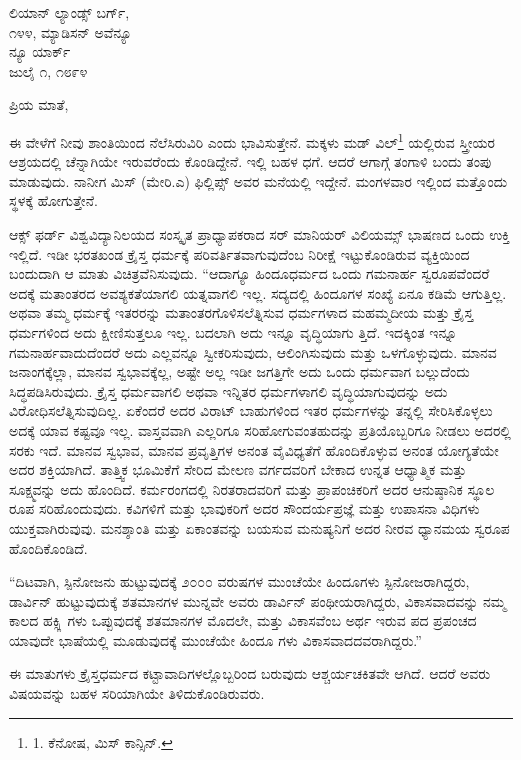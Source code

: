 \begin{flushright}
 ಲಿಯಾನ್ ಲ್ಯಾಂಡ್ಸ್ ಬರ್ಗ್,\\೧೪೪, ಮ್ಯಾಡಿಸನ್ ಅವೆನ್ಯೂ\\ನ್ಯೂ ಯಾರ್ಕ್\\ಜುಲೈ ೧, ೧೮೯೪
\end{flushright}

ಪ್ರಿಯ ಮಾತೆ,

ಈ ವೇಳೆಗೆ ನೀವು ಶಾಂತಿಯಿಂದ ನೆಲೆಸಿರುವಿರಿ ಎಂದು ಭಾವಿಸುತ್ತೇನೆ. ಮಕ್ಕಳು ಮಡ್ ವಿಲ್\footnote{1. ಕೆನೋಷ, ಮಿಸ್ ಕಾನ್ಸಿನ್.} ಯಲ್ಲಿರುವ ಸ್ತ್ರೀಯರ ಆಶ್ರಯದಲ್ಲಿ ಚೆನ್ನಾಗಿಯೇ ಇರುವರೆಂದು ಕೊಂಡಿದ್ದೇನೆ. ಇಲ್ಲಿ ಬಹಳ ಧಗೆ. ಆದರೆ ಆಗಾಗ್ಗೆ ತಂಗಾಳಿ ಬಂದು ತಂಪು ಮಾಡುವುದು. ನಾನೀಗ ಮಿಸ್ (ಮೇರಿ.ಎ) ಫಿಲ್ಲಿಪ್ಸ್ ಅವರ ಮನೆಯಲ್ಲಿ ಇದ್ದೇನೆ. ಮಂಗಳವಾರ ಇಲ್ಲಿಂದ ಮತ್ತೊಂದು ಸ್ಥಳಕ್ಕೆ ಹೋಗುತ್ತೇನೆ.

ಆಕ್ಸ್ ಫರ್ಡ್ ವಿಶ್ವವಿದ್ಯಾನಿಲಯದ ಸಂಸ್ಕೃತ ಪ್ರಾಧ್ಯಾಪಕರಾದ ಸರ್ ಮಾನಿಯರ್ ವಿಲಿಯಮ್ಸ್ ಭಾಷಣದ ಒಂದು ಉಕ್ತಿ ಇಲ್ಲಿದೆ. ಇಡೀ ಭರತಖಂಡ ಕ್ರೈಸ್ತ ಧರ್ಮಕ್ಕೆ ಪರಿವರ್ತಿತವಾಗುವುದೆಂಬ ನಿರೀಕ್ಷೆ ಇಟ್ಟುಕೊಂಡಿರುವ ವ್ಯಕ್ತಿಯಿಂದ ಬಂದುದಾಗಿ ಆ ಮಾತು ವಿಚಿತ್ರವೆನಿಸುವುದು. “ಆದಾಗ್ಯೂ ಹಿಂದೂಧರ್ಮದ ಒಂದು ಗಮನಾರ್ಹ ಸ್ವರೂಪವೆಂದರೆ ಅದಕ್ಕೆ ಮತಾಂತರದ ಅವಶ್ಯಕತೆಯಾಗಲಿ ಯತ್ನವಾಗಲಿ ಇಲ್ಲ. ಸದ್ಯದಲ್ಲಿ ಹಿಂದೂಗಳ ಸಂಖ್ಯೆ ಏನೂ ಕಡಿಮೆ ಆಗುತ್ತಿಲ್ಲ. ಅಥವಾ ತಮ್ಮ ಧರ್ಮಕ್ಕೆ ಇತರರನ್ನು ಮತಾಂತರಗೊಳಿಸಲೆತ್ನಿಸುವ ಧರ್ಮಗಳಾದ ಮಹಮ್ಮದೀಯ ಮತ್ತು ಕ್ರೈಸ್ತ ಧರ್ಮಗಳಿಂದ ಅದು ಕ್ಷೀಣಿಸುತ್ತಲೂ ಇಲ್ಲ. ಬದಲಾಗಿ ಅದು ಇನ್ನೂ ವೃದ್ಧಿಯಾಗು ತ್ತಿದೆ. ಇದಕ್ಕಿಂತ ಇನ್ನೂ ಗಮನಾರ್ಹವಾದುದೆಂದರೆ ಅದು ಎಲ್ಲವನ್ನೂ ಸ್ವೀಕರಿಸುವುದು, ಆಲಿಂಗಿಸುವುದು ಮತ್ತು ಒಳಗೊಳ್ಳುವುದು. ಮಾನವ ಜನಾಂಗಕ್ಕೆಲ್ಲಾ, ಮಾನವ ಸ್ವಭಾವಕ್ಕೆಲ್ಲ, ಅಷ್ಟೇ ಅಲ್ಲ ಇಡೀ ಜಗತ್ತಿಗೇ ಅದು ಒಂದು ಧರ್ಮವಾಗ ಬಲ್ಲುದೆಂದು ಸಿದ್ಧಪಡಿಸಿರುವುದು. ಕ್ರೈಸ್ತ ಧರ್ಮವಾಗಲಿ ಅಥವಾ ಇನ್ನಿತರ ಧರ್ಮಗಳಾಗಲಿ ವೃದ್ಧಿಯಾಗುವುದನ್ನು ಅದು ವಿರೋಧಿಸಲೆತ್ನಿಸುವುದಿಲ್ಲ. ಏಕೆಂದರೆ ಅದರ ವಿರಾಟ್ ಬಾಹುಗಳಿಂದ ಇತರ ಧರ್ಮಗಳನ್ನು ತನ್ನಲ್ಲಿ ಸೇರಿಸಿಕೊಳ್ಳಲು ಅದಕ್ಕೆ ಯಾವ ಕಷ್ಟವೂ ಇಲ್ಲ. ವಾಸ್ತವವಾಗಿ ಎಲ್ಲರಿಗೂ ಸರಿಹೋಗುವಂತಹುದನ್ನು ಪ್ರತಿಯೊಬ್ಬರಿಗೂ ನೀಡಲು ಅದರಲ್ಲಿ ಸರಕು ಇದೆ. ಮಾನವ ಸ್ವಭಾವ, ಮಾನವ ಪ್ರವೃತ್ತಿಗಳ ಅನಂತ ವೈವಿಧ್ಯತೆಗೆ ಹೊಂದಿಕೊಳ್ಳುವ ಅನಂತ ಯೋಗ್ಯತೆಯೇ ಅದರ ಶಕ್ತಿಯಾಗಿದೆ. ತಾತ್ತ್ವಿಕ ಭೂಮಿಕೆಗೆ ಸೇರಿದ ಮೇಲಣ ವರ್ಗದವರಿಗೆ ಬೇಕಾದ ಉನ್ನತ ಆಧ್ಯಾತ್ಮಿಕ ಮತ್ತು ಸೂಕ್ಷ್ಮವನ್ನು ಅದು ಹೊಂದಿದೆ. ಕರ್ಮರಂಗದಲ್ಲಿ ನಿರತರಾದವರಿಗೆ ಮತ್ತು ಪ್ರಾಪಂಚಿಕರಿಗೆ ಅದರ ಆನುಷ್ಠಾನಿಕ ಸ್ಥೂಲ ರೂಪ ಸರಿಹೊಂದುವುದು. ಕವಿಗಳಿಗೆ ಮತ್ತು ಭಾವುಕರಿಗೆ ಅದರ ಸೌಂದರ್ಯಪ್ರಜ್ಞೆ ಮತ್ತು ಉಪಾಸನಾ ವಿಧಿಗಳು ಯುಕ್ತವಾಗಿರುವುವು. ಮನಶ್ಶಾಂತಿ ಮತ್ತು ಏಕಾಂತವನ್ನು ಬಯಸುವ ಮನುಷ್ಯನಿಗೆ ಅದರ ನೀರವ ಧ್ಯಾನಮಯ ಸ್ವರೂಪ ಹೊಂದಿಕೊಂಡಿದೆ.

“ದಿಟವಾಗಿ, ಸ್ಪಿನೋಜನು ಹುಟ್ಟುವುದಕ್ಕೆ ೨೦೦೦ ವರುಷಗಳ ಮುಂಚೆಯೇ ಹಿಂದೂಗಳು ಸ್ಪಿನೋಜರಾಗಿದ್ದರು, ಡಾರ್ವಿನ್ ಹುಟ್ಟುವುದುಕ್ಕೆ ಶತಮಾನಗಳ ಮುನ್ನವೇ ಅವರು ಡಾರ್ವಿನ್ ಪಂಥೀಯರಾಗಿದ್ದರು, ವಿಕಾಸವಾದವನ್ನು ನಮ್ಮ ಕಾಲದ ಹಕ್ಸ್ಲಿ ಗಳು ಒಪ್ಪುವುದಕ್ಕೆ ಶತಮಾನಗಳ ಮೊದಲೇ, ಮತ್ತು ವಿಕಾಸವೆಂಬ ಅರ್ಥ ಇರುವ ಪದ ಪ್ರಪಂಚದ ಯಾವುದೇ ಭಾಷೆಯಲ್ಲಿ ಮೂಡುವುದಕ್ಕೆ ಮುಂಚೆಯೇ ಹಿಂದೂ ಗಳು ವಿಕಾಸವಾದದವರಾಗಿದ್ದರು.”

ಈ ಮಾತುಗಳು ಕ್ರೈಸ್ತಧರ್ಮದ ಕಟ್ಟಾವಾದಿಗಳಲ್ಲೊಬ್ಬರಿಂದ ಬರುವುದು ಆಶ್ಚರ್ಯಚಕಿತವೇ ಆಗಿದೆ. ಆದರೆ ಅವರು ವಿಷಯವನ್ನು ಬಹಳ ಸರಿಯಾಗಿಯೇ ತಿಳಿದುಕೊಂಡಿರುವರು.


